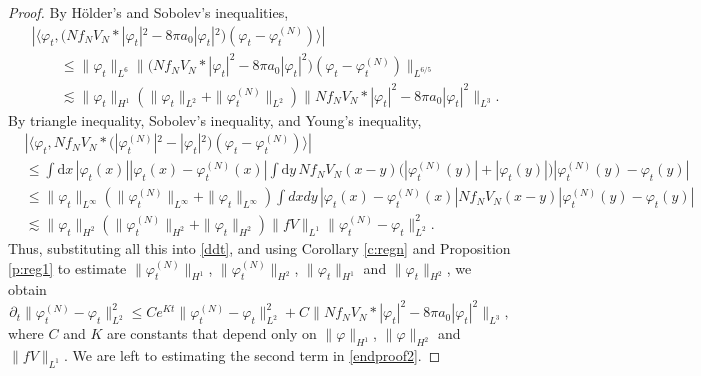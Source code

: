 \documentclass[11pt,a4paper,DIV11]{scrartcl}	%
\newcommand{\di}{\textrm{d}}		%
\begin{document}
\begin{proof}
  By H\"older's and Sobolev's inequalities,
  \begin{align*}
    & |\langle \varphi_t, \big(N f_N V_N * |\varphi_t|^2 - 8 \pi a_0
    |\varphi_t|^2\big) (\varphi_t - \varphi_t^{(N)}) \rangle| \\
    & \qquad \le \| \varphi_t \|_{L^6} \| \big(N f_N V_N * |\varphi_t|^2 - 8 \pi
    a_0 |\varphi_t|^2\big) (\varphi_t - \varphi_t^{(N)}) \|_{L^{6/5}} \\
    & \qquad \apprle \| \varphi_t \|_{H^1} (\| \varphi_t \|_{L^2} + \|
    \varphi_t^{(N)} \|_{L^2}) \| N f_N V_N * |\varphi_t|^2 - 8 \pi a_0
    |\varphi_t|^2 \|_{L^3}.
  \end{align*}
  By triangle inequality, Sobolev's inequality, and Young's inequality,
  \begin{align*}
    & |\langle \varphi_t, N f_N V_N * \big(|\varphi_t^{(N)}|^2 -
    |\varphi_t|^2\big) (\varphi_t - \varphi_t^{(N)}) \rangle| \\
    & \le \int \di x\, |\varphi_t(x)| |\varphi_t(x) - \varphi_t^{(N)}(x)|
    \int \di y\, N f_N V_N(x-y) \big(|\varphi_t^{(N)}(y)| +
    |\varphi_t(y)|\big) |\varphi_t^{(N)}(y) - \varphi_t(y)| \\
    & \le \| \varphi_t \|_{L^\infty} ( \| \varphi_t^{(N)} \|_{L^\infty} + \|
    \varphi_t \|_{L^\infty} ) \int dx dy \, |\varphi_t(x) -
    \varphi_t^{(N)}(x)| N f_N V_N(x-y) |\varphi_t^{(N)}(y) - \varphi_t(y)|
    \\
    & \apprle \| \varphi_t \|_{H^2} ( \| \varphi_t^{(N)} \|_{H^2} + \|
    \varphi_t \|_{H^2} ) \| fV \|_{L^1} \| \varphi_t^{(N)} - \varphi_t
    \|_{L^2}^2.
  \end{align*}
  Thus, substituting all this into \eqref{ddt}, and using Corollary
  \ref{c:regn} and Proposition \ref{p:reg1} to estimate $\| \varphi_t^{(N)}
  \|_{H^1}$, $\|
  \varphi_t^{(N)} \|_{H^2}$, $\| \varphi_t \|_{H^1}$ and $\| \varphi_t
  \|_{H^2}$, we obtain
  \begin{equation} \label{endproof2}
    \partial_t \| \varphi_t^{(N)} - \varphi_t \|_{L^2}^2 \le C e^{Kt} \|
    \varphi_t^{(N)} - \varphi_t \|_{L^2}^2 + C \| N f_N V_N * |\varphi_t|^2
    - 8 \pi a_0 |\varphi_t|^2 \|_{L^3},
  \end{equation}
  where $C$ and $K$ are constants that depend only on $\| \varphi \|_{H^1}$,
  $\| \varphi \|_{H^2}$ and $\| fV \|_{L^1}$. We are left to estimating the
  second term in \eqref{endproof2}.



\end{proof}
\end{document}

